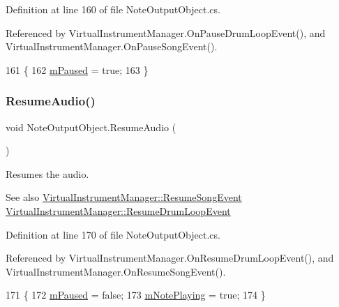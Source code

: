 Definition at line 160 of file Note\+Output\+Object.\+cs.



Referenced by Virtual\+Instrument\+Manager.\+On\+Pause\+Drum\+Loop\+Event(), and Virtual\+Instrument\+Manager.\+On\+Pause\+Song\+Event().


\begin{DoxyCode}
161     \{
162         \hyperlink{group___n_o_o_priv_var_ga50fe6047e6a199215fc70b9fc78ac7eb}{mPaused} = \textcolor{keyword}{true};
163     \}
\end{DoxyCode}
\mbox{\label{group___n_o_o_pub_func_ga2df8edec357dd4123146c9a7e8485ffb}} 
\subsubsection{\texorpdfstring{Resume\+Audio()}{ResumeAudio()}}
{\footnotesize\ttfamily void Note\+Output\+Object.\+Resume\+Audio (\begin{DoxyParamCaption}{ }\end{DoxyParamCaption})}



Resumes the audio. 

\begin{DoxySeeAlso}{See also}
\hyperlink{group___v_i_m_event_types_class_virtual_instrument_manager_1_1_resume_song_event}{Virtual\+Instrument\+Manager\+::\+Resume\+Song\+Event} \hyperlink{group___v_i_m_event_types_class_virtual_instrument_manager_1_1_resume_drum_loop_event}{Virtual\+Instrument\+Manager\+::\+Resume\+Drum\+Loop\+Event} 
\end{DoxySeeAlso}


Definition at line 170 of file Note\+Output\+Object.\+cs.



Referenced by Virtual\+Instrument\+Manager.\+On\+Resume\+Drum\+Loop\+Event(), and Virtual\+Instrument\+Manager.\+On\+Resume\+Song\+Event().


\begin{DoxyCode}
171     \{
172         \hyperlink{group___n_o_o_priv_var_ga50fe6047e6a199215fc70b9fc78ac7eb}{mPaused} = \textcolor{keyword}{false};
173         \hyperlink{group___n_o_o_priv_var_ga4417170b8fa977f05a0b4cd0d16412fd}{mNotePlaying} = \textcolor{keyword}{true};
174     \}
\end{DoxyCode}
\mbox{\label{group___n_o_o_pub_func_gaef9ab691f0a2671a62249d853f24162d}} 
